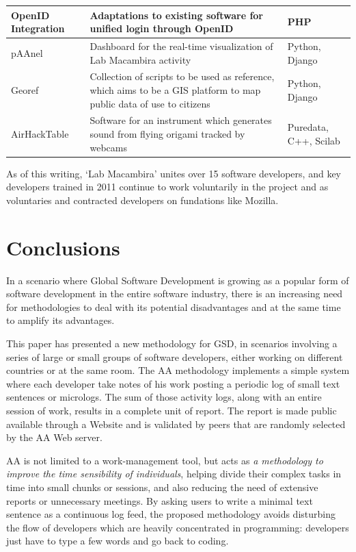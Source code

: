 \documentclass{article}
\begin{document}
\begin{table}
{\begin{tabular}{|l|p{5cm}|l|}
        \hline
        OpenID Integration & Adaptations to existing software for
        unified login through OpenID & PHP \\
        \hline
        pAAnel & Dashboard for the real-time visualization of Lab
        Macambira activity & Python, Django \\
        \hline
        Georef & Collection of scripts to be used as reference, which
        aims to be a GIS platform to map public data of use to
        citizens & Python, Django \\
        \hline
        AirHackTable & Software for an instrument which generates
        sound from flying origami tracked by webcams & Puredata,
        C++, Scilab \\
        \hline
        \end{tabular}}
    \label{tabela:criados}
\end{table}

As of this writing, `Lab Macambira' unites over 15 software developers, and 
key developers trained in 2011 continue to work voluntarily in the project and
as voluntaries and contracted developers on fundations like Mozilla.

\section{Conclusions}
\label{conclusions}

In a scenario where Global Software Development is growing as a popular form of
software development in the entire software industry, there is an increasing
need for methodologies to deal with its potential disadvantages and at the same
time to amplify its advantages.

This paper has presented a new methodology for GSD, in scenarios
involving a series of large or small groups of software developers, either working on
different countries or at the same room. The AA methodology
implements a simple system where each developer take notes of his work
posting a periodic log of small text sentences or micrologs. The sum of those
activity logs, along with an entire session of work, results in a complete
unit of report. The report is made public available through a Website and is
validated by peers that are randomly selected by the AA Web server.

AA is not limited to a work-management tool, but acts as \emph{a
methodology to improve the time sensibility of individuals}, helping divide their
complex tasks in time into small chunks or sessions, and also reducing the need
of extensive reports or unnecessary meetings. By asking users to write a minimal
text sentence as a continuous log feed, the proposed methodology avoids
disturbing the flow of developers which are heavily concentrated in programming:
developers just have to type a few words and go back to coding.
\end{document}

